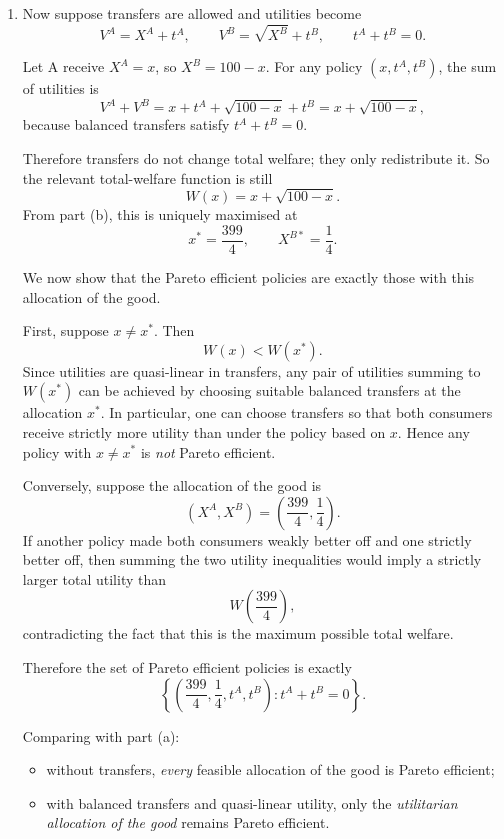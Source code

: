 \documentclass[12pt]{article}
\begin{document}
\begin{enumerate}[label=(\alph*)]
    To check that this is indeed a maximum, note that
    \[
    W''(x)=-\frac{1}{4(100-x)^{3/2}}<0
    \]
    for all \(x\in[0,100)\). So \(W\) is strictly concave, and the critical point is the unique maximiser.

    Thus the utilitarian allocation is
    \[
    \boxed{\left(X^A,X^B\right)=\left(\frac{399}{4},\frac14\right).}
    \]

    \item
    Now suppose transfers are allowed and utilities become
    \[
    V^A=X^A+t^A,
    \qquad
    V^B=\sqrt{X^B}+t^B,
    \qquad
    t^A+t^B=0.
    \]

    Let A receive \(X^A=x\), so \(X^B=100-x\). For any policy \((x,t^A,t^B)\), the sum of utilities is
    \[
    V^A+V^B
    =x+t^A+\sqrt{100-x}+t^B
    =x+\sqrt{100-x},
    \]
    because balanced transfers satisfy \(t^A+t^B=0\).

    Therefore transfers do not change total welfare; they only redistribute it. So the relevant total-welfare function is still
    \[
    W(x)=x+\sqrt{100-x}.
    \]
    From part (b), this is uniquely maximised at
    \[
    x^*=\frac{399}{4},
    \qquad
    X^{B*}=\frac14.
    \]

    We now show that the Pareto efficient policies are exactly those with this allocation of the good.

    First, suppose \(x\neq x^*\). Then
    \[
    W(x)<W(x^*).
    \]
    Since utilities are quasi-linear in transfers, any pair of utilities summing to \(W(x^*)\) can be achieved by choosing suitable balanced transfers at the allocation \(x^*\). In particular, one can choose transfers so that both consumers receive strictly more utility than under the policy based on \(x\). Hence any policy with \(x\neq x^*\) is \emph{not} Pareto efficient.

    Conversely, suppose the allocation of the good is
    \[
    \left(X^A,X^B\right)=\left(\frac{399}{4},\frac14\right).
    \]
    If another policy made both consumers weakly better off and one strictly better off, then summing the two utility inequalities would imply a strictly larger total utility than
    \[
    W\!\left(\frac{399}{4}\right),
    \]
    contradicting the fact that this is the maximum possible total welfare.

    Therefore the set of Pareto efficient policies is exactly
    \[
    \boxed{
    \left\{
    \left(\frac{399}{4},\frac14,t^A,t^B\right):
    t^A+t^B=0
    \right\}.}
    \]

    Comparing with part (a):
    \begin{itemize}[leftmargin=*]
        \item without transfers, \emph{every} feasible allocation of the good is Pareto efficient;
        \item with balanced transfers and quasi-linear utility, only the \emph{utilitarian allocation of the good} remains Pareto efficient.
    \end{itemize}


\end{enumerate}
\end{document}
